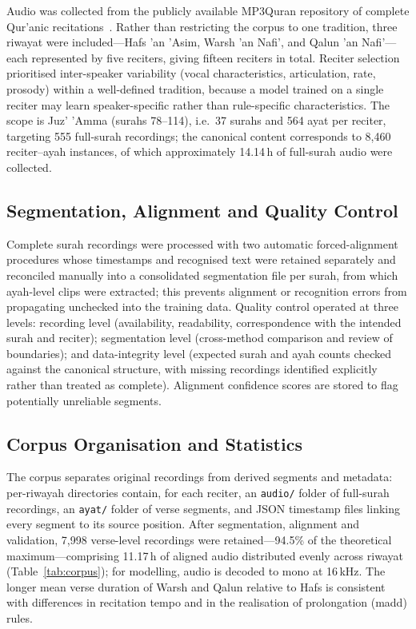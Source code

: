 \documentclass[runningheads]{llncs}
\begin{document}
Audio was collected from the publicly available MP3Quran repository of complete
Qur'anic recitations~\cite{mp3quran}. Rather than restricting the corpus to one
tradition, three riwayat were included---Hafs 'an 'Asim, Warsh 'an Nafi', and
Qalun 'an Nafi'---each represented by five reciters, giving fifteen reciters in
total. Reciter selection prioritised inter-speaker variability (vocal
characteristics, articulation, rate, prosody) within a well-defined tradition,
because a model trained on a single reciter may learn speaker-specific rather
than rule-specific characteristics. The scope is Juz' 'Amma (surahs 78--114),
i.e.\ 37 surahs and 564 ayat per reciter, targeting 555 full-surah recordings;
the canonical content corresponds to 8{,}460 reciter--ayah instances, of which
approximately 14.14\,h of full-surah audio were collected.

\subsection{Segmentation, Alignment and Quality Control}

Complete surah recordings were processed with two automatic forced-alignment
procedures whose timestamps and recognised text were retained separately and
reconciled manually into a consolidated segmentation file per surah, from which
ayah-level clips were extracted; this prevents alignment or recognition errors
from propagating unchecked into the training data. Quality control operated at
three levels: recording level (availability, readability, correspondence with
the intended surah and reciter); segmentation level (cross-method comparison and
review of boundaries); and data-integrity level (expected surah and ayah counts
checked against the canonical structure, with missing recordings identified
explicitly rather than treated as complete). Alignment confidence scores are
stored to flag potentially unreliable segments.

\subsection{Corpus Organisation and Statistics}

The corpus separates original recordings from derived segments and metadata:
per-riwayah directories contain, for each reciter, an \texttt{audio/} folder of
full-surah recordings, an \texttt{ayat/} folder of verse segments, and JSON
timestamp files linking every segment to its source position. After
segmentation, alignment and validation, 7{,}998 verse-level recordings were
retained---94.5\% of the theoretical maximum---comprising 11.17\,h of aligned
audio distributed evenly across riwayat (Table~\ref{tab:corpus}); for modelling,
audio is decoded to mono at 16\,kHz. The longer mean verse duration of Warsh and
Qalun relative to Hafs is consistent with differences in recitation tempo and in
the realisation of prolongation (madd) rules.
\end{document}
